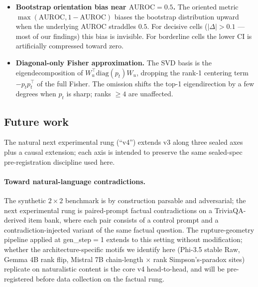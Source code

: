\documentclass[10pt, letterpaper]{article}
\newcommand{\Wu}{W_u}
\newcommand{\auroc}{\text{AUROC}}
\begin{document}
\begin{itemize}[leftmargin=*, itemsep=2pt, topsep=2pt]
  separation. It did not, and that amendment is recorded as falsified.
  The sealed E18 and E17b verdicts reported here are unaffected, since
  both are defined on the uncentered pullback; but the negative bounds
  how far the ``curved geometry'' reading should be pushed. The
  centered metric is not a strictly better object, and a reader should
  not infer that every Fisher-flavoured refinement of this construction
  improves on it.
  \item \textbf{Bootstrap orientation bias near $\auroc = 0.5$.} The
  oriented metric $\max(\auroc, 1-\auroc)$ biases the bootstrap
  distribution upward when the underlying AUROC straddles $0.5$. For
  decisive cells ($|\Delta| > 0.1$ --- most of our findings) this bias
  is invisible. For borderline cells the lower CI is artificially
  compressed toward zero.
  \item \textbf{Diagonal-only Fisher approximation.} The SVD basis is
  the eigendecomposition of $\Wu^\top \mathrm{diag}(p_t) \Wu$,
  dropping the rank-1 centering term $-p_t p_t^\top$ of the full
  Fisher. The omission shifts the top-1 eigendirection by a few
  degrees when $p_t$ is sharp; ranks $\geq 4$ are unaffected.
\end{itemize}

\subsection{Future work}
\label{sec:disc:future}

The natural next experimental rung (``v4'') extends v3 along three
sealed axes plus a causal extension; each axis is intended to
preserve the same sealed-spec pre-registration discipline used here.

\paragraph{Toward natural-language contradictions.}
The synthetic $2 \times 2$ benchmark is by construction parsable and
adversarial; the next experimental rung is paired-prompt factual
contradictions on a TriviaQA-derived item bank, where each pair
consists of a control prompt and a contradiction-injected variant of
the same factual question. The rupture-geometry pipeline applied at
gen\_step$=$1 extends to this setting without modification; whether
the architecture-specific motifs we identify here (Phi-3.5 stable
Raw, Gemma 4B rank flip, Mistral 7B chain-length $\times$ rank
Simpson's-paradox sites) replicate on naturalistic content is the
core v4 head-to-head, and will be pre-registered before data
collection on the factual rung.
\end{document}
